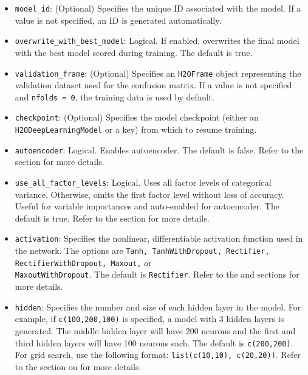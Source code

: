 {{\begin{itemize}
\item \texttt{model\_id}: (Optional) Specifies the unique ID associated with the model. If a value is not specified, an ID is generated automatically. 

\item \texttt{overwrite\_with\_best\_model}: Logical. If enabled, overwrites the final model with the best model scored during training. The default is true.

\item \texttt{validation\_frame}: (Optional) Specifies an \texttt{H2OFrame} object representing the validation dataset used for the confusion matrix. If a value is not specified and \texttt{nfolds = 0}, the training data is used by default. 

\item \texttt{checkpoint}: (Optional) Specifies the model checkpoint (either an \\ \texttt{H2ODeepLearningModel} or a key) from which to resume training. 

\item \texttt{autoencoder}: Logical. Enables autoencoder. The default is false. Refer to the {\textbf{}} section for more details.

\item \texttt{use\_all\_factor\_levels}: Logical. Uses all factor levels of categorical variance. Otherwise, omits the first factor level without loss of accuracy. Useful for variable importances and auto-enabled for autoencoder.  The default is true. Refer to the {\textbf{}} section for more details.

\item \texttt{activation}: Specifies the nonlinear, differentiable activation function used in the network. The options are \texttt{Tanh, TanhWithDropout, Rectifier, RectifierWithDropout, Maxout,} or \\\texttt{MaxoutWithDropout}. The default is \texttt{Rectifier}. Refer to the {\textbf{}} and {\textbf{}} sections for more details.

\item \texttt{hidden}: Specifies the number and size of each hidden layer in the model. For example, if \texttt{c(100,200,100)} is specified, a model with 3 hidden layers is generated. The middle hidden layer will have 200 neurons and the first and third hidden layers will have 100 neurons each. The default is \texttt{c(200,200)}. For grid search, use the following format: \texttt{list(c(10,10), c(20,20))}. Refer to the section on  {\textbf{}} for more details. 


\end{itemize}}}
